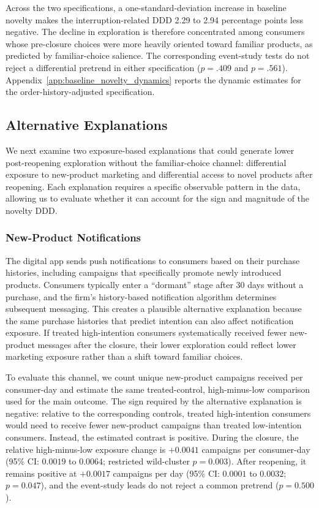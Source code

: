 \documentclass[11 pt]{article}
\begin{document}
Across the two specifications, a one-standard-deviation increase in baseline novelty makes the interruption-related DDD 2.29 to 2.94 percentage points less negative. The decline in exploration is therefore concentrated among consumers whose pre-closure choices were more heavily oriented toward familiar products, as predicted by familiar-choice salience. The corresponding event-study tests do not reject a differential pretrend in either specification ($p=.409$ and $p=.561$). Appendix~\ref{app:baseline_novelty_dynamics} reports the dynamic estimates for the order-history-adjusted specification.

\subsection{Alternative Explanations}
\label{section:alternative_explanations}

We next examine two exposure-based explanations that could generate lower post-reopening exploration without the familiar-choice channel: differential exposure to new-product marketing and differential access to novel products after reopening. Each explanation requires a specific observable pattern in the data, allowing us to evaluate whether it can account for the sign and magnitude of the novelty DDD.

\subsubsection{New-Product Notifications}
\label{section:alternative_new_product_notifications}

The digital app sends push notifications to consumers based on their purchase histories, including campaigns that specifically promote newly introduced products. Consumers typically enter a ``dormant'' stage after 30 days without a purchase, and the firm's history-based notification algorithm determines subsequent messaging. This creates a plausible alternative explanation because the same purchase histories that predict intention can also affect notification exposure. If treated high-intention consumers systematically received fewer new-product messages after the closure, their lower exploration could reflect lower marketing exposure rather than a shift toward familiar choices.

To evaluate this channel, we count unique new-product campaigns received per consumer-day and estimate the same treated-control, high-minus-low comparison used for the main outcome. The sign required by the alternative explanation is negative: relative to the corresponding controls, treated high-intention consumers would need to receive fewer new-product campaigns than treated low-intention consumers. Instead, the estimated contrast is positive. During the closure, the relative high-minus-low exposure change is $+0.0041$ campaigns per consumer-day (95\% CI: $0.0019$ to $0.0064$; restricted wild-cluster $p=0.003$). After reopening, it remains positive at $+0.0017$ campaigns per day (95\% CI: $0.0001$ to $0.0032$; $p=0.047$), and the event-study leads do not reject a common pretrend ($p=0.500$).
\end{document}
